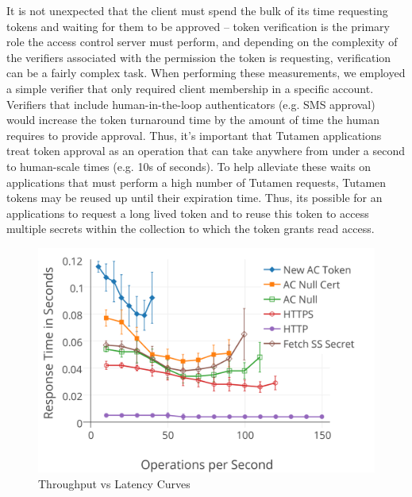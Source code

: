 It is not unexpected that the client must spend the bulk of its time
requesting tokens and waiting for them to be approved -- token
verification is the primary role the access control server must
perform, and depending on the complexity of the verifiers associated
with the permission the token is requesting, verification can be a
fairly complex task. When performing these measurements, we employed a
simple verifier that only required client membership in a specific
account. Verifiers that include human-in-the-loop authenticators
(e.g. SMS approval) would increase the token turnaround time by the
amount of time the human requires to provide approval. Thus, it's
important that Tutamen applications treat token approval as an
operation that can take anywhere from under a second to human-scale
times (e.g. 10s of seconds). To help alleviate these waits on
applications that must perform a high number of Tutamen requests,
Tutamen tokens may be reused up until their expiration time. Thus, its
possible for an applications to request a long lived token and to
reuse this token to access multiple secrets within the collection to
which the token grants read access.
 
\begin{figure}[th]
  \centering
  \includegraphics[width=\columnwidth]{./figs/png/chart-iops.png}
  \caption{Throughput vs Latency Curves}
  \label{fig:eval:iops}
\end{figure}

